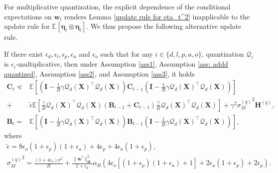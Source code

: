 \documentclass[11pt, letterpaper]{article}
\begin{document}
For multiplicative quantization, the explicit dependence of the conditional expectations on $\mathbf{w}_t$ renders Lemma \ref{update rule for eta_t^2} inapplicable to the update rule for $\mathbb{E}[\boldsymbol{\eta}_t\otimes\boldsymbol{\eta}_t]$. We thus propose the following alternative update rule.

\begin{lemma}
    \label{update rule for eta_t^2 multiplicative}
    If there exist $\epsilon_d,\epsilon_l,\epsilon_p,\epsilon_a$ and $\epsilon_o$ such that for any $i\in \{d,l,p,a,o\}$, quantization $\mathcal{Q}_i$ is $\epsilon_i$-multiplicative, then under Assumption \ref{ass1}, Assumption \ref{ass: addd quantized}, Assumption \ref{ass2}, and Assumption \ref{ass3}, it holds
    \begin{equation*}
        \begin{aligned}
            \mathbf{C}_t
            \preceq&\mathbb{E}\left[\left(\mathbf{I}-\frac{1}{B}\gamma {\mathcal{Q}_d(\mathbf{X})}^\top \mathcal{Q}_d(\mathbf{X}) \right)\mathbf{C}_{t-1}\left(\mathbf{I}-\frac{1}{B}\gamma {\mathcal{Q}_d(\mathbf{X})}^\top \mathcal{Q}_d(\mathbf{X}) \right)\right]\\
            +&\tilde{\epsilon}\mathbb{E}\left[\frac{\gamma}{B}{\mathcal{Q}_d(\mathbf{X})}^\top {\mathcal{Q}_d(\mathbf{X})}(\mathbf{B}_{t-1}+\mathbf{C}_{t-1})\frac{\gamma}{B}{\mathcal{Q}_d(\mathbf{X})}^\top\mathcal{Q}_d(\mathbf{X})\right]
            +\gamma^2 {\sigma_M^{(q)}}^2\mathbf{H}^{(q)},\\
            \mathbf{B}_t=& \mathbb{E}\left[\left(\mathbf{I}-\frac{1}{B}\gamma {\mathcal{Q}_d(\mathbf{X})}^\top \mathcal{Q}_d(\mathbf{X}) \right)\mathbf{B}_{t-1}\left(\mathbf{I}-\frac{1}{B}\gamma {\mathcal{Q}_d(\mathbf{X})}^\top \mathcal{Q}_d(\mathbf{X}) \right)\right],
        \end{aligned}
    \end{equation*}
    where
    \begin{gather*}
            \tilde{\epsilon}=8\epsilon_o(1+\epsilon_p)(1+\epsilon_a)+4\epsilon_p+4\epsilon_a(1+\epsilon_p),\\
            {\sigma_M^{(q)}}^2=\frac{(1+4\epsilon_o)\sigma^2}{B} + \frac{\|\mathbf{w}^*\|_\mathbf{H}^2}{1+\epsilon_d}\alpha_B\left(4\epsilon_o[(1+\epsilon_p)(1+\epsilon_a)+1]+2\epsilon_a(1+\epsilon_p)+2\epsilon_p \right).
    \end{gather*}
\end{lemma}
\end{document}
